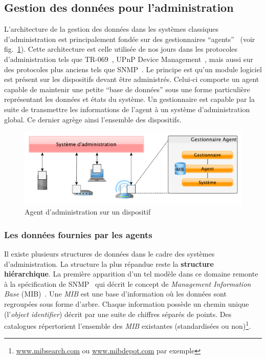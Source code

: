 \subsection{Gestion des données pour l'administration}
L'architecture de la gestion des données dans les systèmes classiques d'administration est principalement fondée sur des gestionnaires \enquote{agents}~\cite{CCITT:X700} (voir fig.~\ref{fig:rw:supervision:administration}). Cette architecture est celle utilisée de nos jours dans les protocoles d'administration tels que TR-069~\cite{BBF:tr069}, UPnP Device Management~\cite{UPnP:DM2}, mais aussi sur des protocoles plus anciens tels que SNMP~\cite{IETF:SNMP}. Le principe est qu'un module logiciel est présent sur les dispositifs devant être administrés. Celui-ci comporte un agent capable de maintenir une petite \enquote{base de données} sous une forme particulière représentant les données et états du système. Un gestionnaire est capable par la suite de transmettre les informations de l'agent à un système d'administration global. Ce dernier agrège ainsi l'ensemble des dispositifs.
\begin{figure}[ht]
    \centering
    \includegraphics[width=.70\textwidth]{fig/rw-supervision-administration}
    \caption{Agent d'administration sur un dispositif}\label{fig:rw:supervision:administration}
\end{figure}

\subsubsection{Les données fournies par les agents}
Il existe plusieurs structures de données dans le cadre des systèmes d'administration. La structure la plus répandue reste la \textbf{structure hiérarchique}. La première apparition d'un tel modèle dans ce domaine remonte à la spécification de SNMP~\cite{IETF:SNMP} qui décrit le concept de \textit{Management Information Base} (MIB)~\cite{IETF:MIB}. Une \textit{MIB} est une base d'information où les données sont regroupées sous forme d'arbre. Chaque information possède un chemin unique (l'\textit{object identifier}) décrit par une suite de chiffres séparés de points. Des catalogues répertorient l'ensemble des \textit{MIB} existantes (standardisées ou non)\footnote{\url{www.mibsearch.com} ou \url{www.mibdepot.com} par exemple}.

